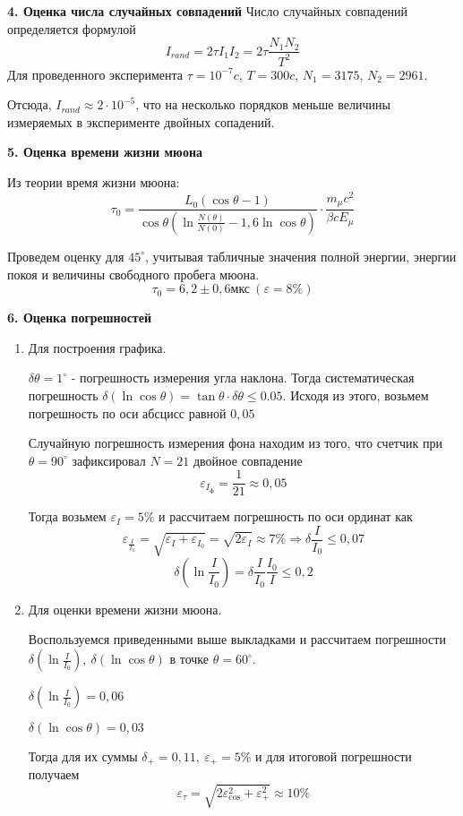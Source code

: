 \documentclass[a4paper,12pt]{article}
\newcommand{\eps}{\varepsilon}
\begin{document}
	{\bf 4. Оценка числа случайных совпадений}
	Число случайных совпадений определяется формулой
	$$I_{rand} = 2\tau I_1 I_2 = 2\tau \frac{N_1N_2}{T^2}$$
	Для проведенного эксперимента
	$\tau = 10^{-7}c$, $T = 300c$, $N_1 = 3175$, $N_2 = 2961$.
	
	Отсюда, $I_{rand} \approx 2\cdot 10^{-5}$, что на несколько порядков меньше величины измеряемых в эксперименте двойных сопадений.
	
	{\bf 5. Оценка времени жизни мюона}
	
	Из теории время жизни мюона:
	$$\tau_0 = \dfrac{L_0 (\cos\theta - 1)}{\cos\theta (\ln\frac{N(\theta)}{N(0)} - 1,6\ln\cos \theta)} \cdot \dfrac {m_\mu c^2}	{\beta c E_\mu}$$
	
	Проведем оценку для $45^\circ$, учитывая табличные значения полной энергии, энергии покоя и величины свободного пробега мюона. 
	$$\tau_0 = 6,2 \pm 0,6 \text{мкс}\ (\eps=8\% )$$
	
	{\bf 6. Оценка погрешностей}
	\begin{enumerate}
		\item Для построения графика.
		
		$\delta \theta = 1^\circ$ - погрешность измерения угла наклона.
		Тогда систематическая погрешность $\delta(\ln\cos\theta) = \tan \theta\cdot \delta\theta \leq 0.05$. 
		Исходя из этого, возьмем погрешность по оси абсцисс равной $0,05$
		
		Случайную погрешность измерения фона находим из того, что счетчик при $\theta = 90^\circ$ зафиксировал $N = 21$ двойное совпадение  
		$$\eps_{ I_\text{ф}} = \frac1{21} \approx 0,05 $$
		
		Тогда возьмем $\eps_I = 5\%$ и рассчитаем погрешность по оси ординат как
		$$\eps _{\frac{I}{I_0}} = \sqrt{\eps_{I}+ \eps_{I_0} } = \sqrt{2\eps_{I}} \approx 7\% \Rightarrow \delta\frac{I}{I_0} \leq 0,07$$
		$$\delta(\ln\frac{I}{I_0}) = \delta\frac{I}{I_0} \frac{I_0}{I}\leq 0,2$$
		
		\item Для оценки времени жизни мюона.
		
		Воспользуемся приведенными выше выкладками и рассчитаем погрешности $\delta(\ln\frac{I}{I_0}), \ \delta(\ln\cos\theta)$ в точке $\theta = 60^\circ$.
		
		$\delta(\ln\frac{I}{I_0}) = 0,06$
		
		$\delta(\ln\cos\theta) = 0,03$
		
		Тогда для их суммы $\delta_+ = 0,11, \ \eps_+ = 5\%$ и для итоговой погрешности получаем	
		$$\eps_\tau = \sqrt{2\eps^2_{\cos} + \eps^2_{+}} \approx 10\% $$
	\end{enumerate}
\end{document}
